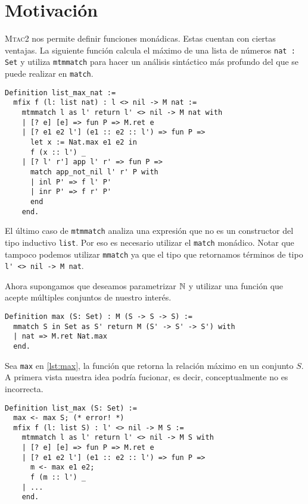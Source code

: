 \chapter{Motivación}\label{ch:motivacion}

\textsc{Mtac2} nos permite definir funciones monádicas. Estas cuentan con ciertas ventajas.
La siguiente función calcula el máximo de una lista de números \lstinline{nat : Set} y utiliza \lstinline{mtmmatch} para hacer un análisis sintáctico más profundo del que se puede realizar en \lstinline{match}. %

\begin{lstlisting}[frame=tb,caption={Función \lstinline{list_max_nat}},label=lst:list_max_nat]
Definition list_max_nat :=
  mfix f (l: list nat) : l <> nil -> M nat :=
    mtmmatch l as l' return l' <> nil -> M nat with
    | [? e] [e] => fun P => M.ret e
    | [? e1 e2 l'] (e1 :: e2 :: l') => fun P =>
      let x := Nat.max e1 e2 in
      f (x :: l') _
    | [? l' r'] app l' r' => fun P =>
      match app_not_nil l' r' P with
      | inl P' => f l' P'
      | inr P' => f r' P'
      end
    end.
\end{lstlisting}

El último caso de \lstinline{mtmmatch} analiza una expresión que no es un constructor del tipo inductivo \lstinline{list}. Por eso es necesario utilizar el \lstinline{match} monádico.
Notar que tampoco podemos utilizar \lstinline{mmatch} ya que el tipo que retornamos términos de tipo \lstinline{l' <> nil -> M nat}.

Ahora supongamos que deseamos parametrizar $\mathbb{N}$ y utilizar una función que acepte múltiples conjuntos de nuestro interés.

\begin{lstlisting}[frame=tb,caption={Función \lstinline{max}},label=lst:max]
Definition max (S: Set) : M (S -> S -> S) :=
  mmatch S in Set as S' return M (S' -> S' -> S') with
  | nat => M.ret Nat.max
  end.
\end{lstlisting}

Sea \lstinline{max} en \ref{lst:max}, la función que retorna la relación máximo en un conjunto $S$.
A primera vista nuestra idea podría fucionar, es decir, conceptualmente no es incorrecta.

\begin{lstlisting}[frame=tb,caption={Función \lstinline{list_max}},label=lst:list_max]
Definition list_max (S: Set) :=
  max <- max S; (* error! *)
  mfix f (l: list S) : l' <> nil -> M S :=
    mtmmatch l as l' return l' <> nil -> M S with
    | [? e] [e] => fun P => M.ret e
    | [? e1 e2 l'] (e1 :: e2 :: l') => fun P =>
      m <- max e1 e2;
      f (m :: l') _
    | ...
    end.
\end{lstlisting}

